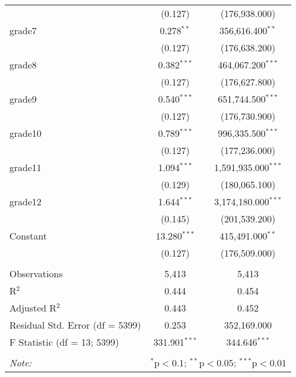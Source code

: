 \documentclass[
  11pt,
  french,
]{article}
\begin{document}
\begin{table}[!htbp]
\begin{tabular}{@{\extracolsep{1pt}}lcc}
  & (0.127) & (176,938.000) \\ 
  grade7 & 0.278$^{**}$ & 356,616.400$^{**}$ \\ 
  & (0.127) & (176,638.200) \\ 
  grade8 & 0.382$^{***}$ & 464,067.200$^{***}$ \\ 
  & (0.127) & (176,627.800) \\ 
  grade9 & 0.540$^{***}$ & 651,744.500$^{***}$ \\ 
  & (0.127) & (176,730.900) \\ 
  grade10 & 0.789$^{***}$ & 996,335.500$^{***}$ \\ 
  & (0.127) & (177,236.000) \\ 
  grade11 & 1.094$^{***}$ & 1,591,935.000$^{***}$ \\ 
  & (0.129) & (180,065.100) \\ 
  grade12 & 1.644$^{***}$ & 3,174,180.000$^{***}$ \\ 
  & (0.145) & (201,539.200) \\ 
  Constant & 13.280$^{***}$ & 415,491.000$^{**}$ \\ 
  & (0.127) & (176,509.000) \\ 
 \hline \\[-1.8ex] 
Observations & 5,413 & 5,413 \\ 
R$^{2}$ & 0.444 & 0.454 \\ 
Adjusted R$^{2}$ & 0.443 & 0.452 \\ 
Residual Std. Error (df = 5399) & 0.253 & 352,169.000 \\ 
F Statistic (df = 13; 5399) & 331.901$^{***}$ & 344.646$^{***}$ \\ 
\hline 
\hline \\[-1.8ex] 
\textit{Note:}  & \multicolumn{2}{r}{$^{*}$p$<$0.1; $^{**}$p$<$0.05; $^{***}$p$<$0.01} \\ 
\end{tabular} 
\end{table}
\end{document}
